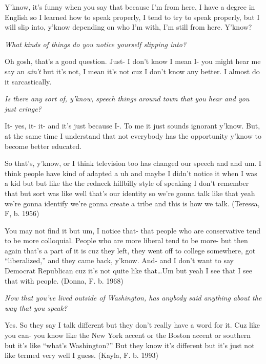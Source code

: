 \begin{num_quote} %
    Y'know, it's funny when you say that because I'm from here, I have a degree in English so I learned how to speak properly, I tend to try to speak properly, but I will slip into, y'know depending on who I'm with, I'm still from here. Y'know?
    
    \textit{What kinds of things do you notice yourself slipping into?}
    
    Oh gosh, that's a good question. Just- I don't know I mean I- you might hear me say an \textit{ain't} but it's not, I mean it's not cuz I don't know any better. I almost do it sarcastically. 
    
    \textit{Is there any sort of, y'know, speech things around town that you hear and you just cringe?}
    
    It- yes, it- it- and it's just because I-. To me it just sounds ignorant y'know. But, at the same time I understand that not everybody has the opportunity y'know to become better educated. 
\end{num_quote}





\begin{num_quote}
    So that's, y'know, or I think television too has changed our speech and and um. I think people have kind of adapted a uh and maybe I didn't notice it when I was a kid but but like the the redneck hillbilly style of speaking I don't remember that but sort was like well that's our identity so we're gonna talk like that yeah we're gonna identify we're gonna create a tribe and this is how we talk. (Teressa, F, b. 1956)
\end{num_quote}


\begin{num_quote}
    You may not find it but um, I notice that- that people who are conservative tend to be more colloquial. People who are more liberal tend to be more- but then again that's a part of it is cuz they left, they went off to college somewhere, got ``liberalized,'' and they came back, y'know. And- and I don't want to say Democrat Republican cuz it's not quite like that\ldots Um but yeah I see that I see that with people.  (Donna, F. b. 1968)
\end{num_quote}





\begin{num_quote}
    \textit{Now that you've lived outside of Washington, has anybody said anything about the way that you speak?}
    
    Yes. So they say I talk different but they don't really have a word for it. Cuz like you can- you know like the New York accent or the Boston accent or southern but it's like ``what's Washington?'' But they know it's different but it's just not like termed very well I guess. (Kayla, F. b. 1993)
 \end{num_quote}
 

